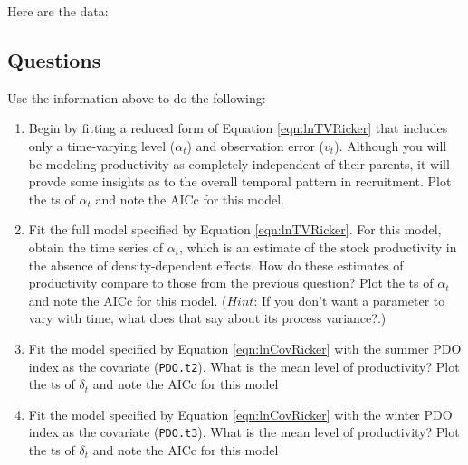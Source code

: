 Here are the data:




\subsection{Questions}

\noindent Use the information above to do the following:

\begin{enumerate} \itemsep5pt \parskip0pt 

\item Begin by fitting a reduced form of Equation \ref{eqn:lnTVRicker} that includes only a time-varying level ($\alpha_t$) and observation error ($v_t$).  Although you will be modeling productivity as completely independent of their parents, it will provde some insights as to the overall temporal pattern in recruitment.  Plot the ts of $\alpha_t$ and note the AICc for this model.

\item Fit the full model specified by Equation \ref{eqn:lnTVRicker}.  For this model, obtain the time series of $\alpha_t$, which is an estimate of the stock productivity in the absence of density-dependent effects. How do these estimates of productivity compare to those from the previous question?  Plot the ts of $\alpha_t$ and note the AICc for this model.  ($Hint$: If you don't want a parameter to vary with time, what does that say about its process variance?.)

\item Fit the model specified by Equation \ref{eqn:lnCovRicker} with the summer PDO index as the covariate (\texttt{PDO.t2}). What is the mean level of productivity?  Plot the ts of $\delta_t$ and note the AICc for this model

\item Fit the model specified by Equation \ref{eqn:lnCovRicker} with the winter PDO index as the covariate (\texttt{PDO.t3}). What is the mean level of productivity?  Plot the ts of $\delta_t$ and note the AICc for this model


\end{enumerate}








